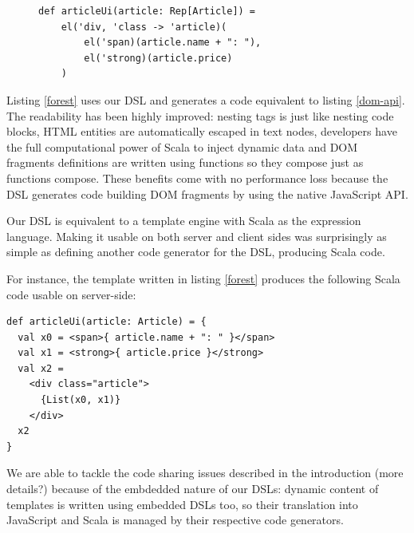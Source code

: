 \documentclass[preprint]{sigplanconf}
\begin{document}
\begin{figure}
\begin{lstlisting}[label=forest,caption=DOM definition DSL]
def articleUi(article: Rep[Article]) =
    el('div, 'class -> 'article)(
        el('span)(article.name + ": "),
        el('strong)(article.price)
    )
\end{lstlisting}
\end{figure}

Listing \ref{forest} uses our DSL and generates a code equivalent to listing \ref{dom-api}. The readability has
been highly improved: nesting tags is just like nesting code blocks, HTML entities are
automatically escaped in text nodes, developers have the full computational power of Scala to inject dynamic data and
DOM fragments definitions are written using functions so they compose just as functions compose. These benefits come
with no performance loss because the DSL generates code building DOM fragments by using the native JavaScript API.

Our DSL is equivalent to a template engine with Scala as the expression language. Making it usable on both server and
client sides was surprisingly as simple as defining another code generator for the DSL, producing Scala code.

For instance, the template written in listing \ref{forest} produces the following Scala code usable on
server-side:

\begin{lstlisting}
def articleUi(article: Article) = {
  val x0 = <span>{ article.name + ": " }</span>
  val x1 = <strong>{ article.price }</strong>
  val x2 =
    <div class="article">
      {List(x0, x1)}
    </div>
  x2
}
\end{lstlisting}

We are able to tackle the code sharing issues described in the introduction (more details?) because of the embdedded
nature of our DSLs: dynamic content of templates is written using embedded DSLs too, so their translation into
JavaScript and Scala is managed by their respective code generators.
\end{document}
